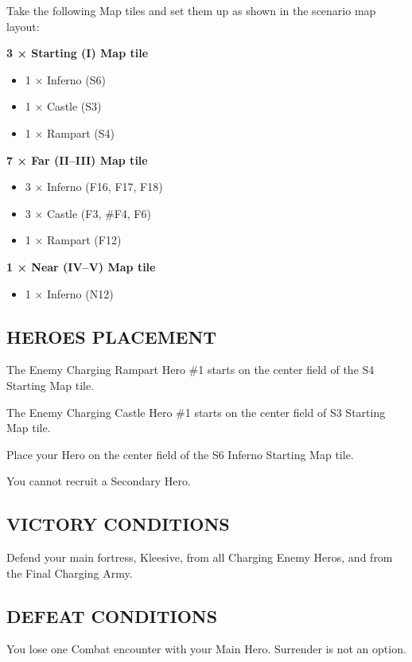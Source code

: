 \begin{multicols*}{2}
Take the following Map tiles and set them up as shown in the scenario map layout:

\textbf{3 × Starting (I) Map tile}
\begin{itemize}
  \item 1 × Inferno (S6)
  \item 1 × Castle (S3)
  \item 1 × Rampart (S4)
\end{itemize}

\textbf{7 × Far (II--III) Map tile}
\begin{itemize}
  \item 3 × Inferno (F16, F17, F18)
  \item 3 × Castle (F3, \#F4, F6)
  \item 1 × Rampart (F12)
\end{itemize}

\textbf{1 × Near (IV--V) Map tile}
\begin{itemize}
  \item 1 × Inferno (N12)
\end{itemize}

\subsection*{\MakeUppercase{Heroes placement}}

The Enemy Charging Rampart Hero \#1 starts on the center field of the S4 Starting Map tile.

The Enemy Charging Castle Hero \#1 starts on the center field of S3 Starting Map tile.

Place your Hero on the center field of the S6 Inferno Starting Map tile.

You cannot recruit a Secondary Hero.

\subsection*{\MakeUppercase{Victory Conditions}}

Defend your main fortress, Kleesive, from all Charging Enemy Heros, and from the Final Charging Army.

\subsection*{\MakeUppercase{Defeat Conditions}}

You lose one Combat encounter with your Main Hero. Surrender is not an option.


\end{multicols*}
